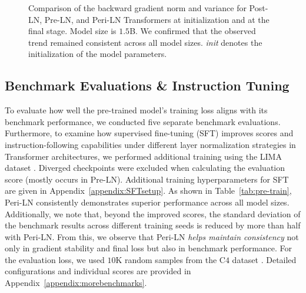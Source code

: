 \begin{figure*}[t]
    \centering
    \caption{Comparison of the backward gradient norm and variance for Post-LN, Pre-LN, and Peri-LN Transformers at initialization and at the final stage. Model size is $1.5$B. We confirmed that the observed trend remained consistent across all model sizes. \textit{init} denotes the initialization of the model parameters.}
    \label{fig:layerwise_gradient}
\vskip -0.1in
\end{figure*}

\subsection{Benchmark Evaluations \& Instruction Tuning} \label{subsec:sft}
To evaluate how well the pre-trained model’s training loss aligns with its benchmark performance, we conducted five separate benchmark evaluations. Furthermore, to examine how supervised fine-tuning (SFT) improves scores and instruction-following capabilities under different layer normalization strategies in Transformer architectures, we performed additional training using the LIMA dataset \citep{instructgpt, lima}. Diverged checkpoints were excluded when calculating the evaluation score (mostly occurs in Pre-LN). Additional training hyperparameters for SFT are given in Appendix~\ref{appendix:SFTsetup}. As shown in Table~\ref{tab:pre-train}, Peri-LN consistently demonstrates superior performance across all model sizes. Additionally, we note that, beyond the improved scores, the standard deviation of the benchmark results across different training seeds is reduced by more than half with Peri-LN. From this, we observe that Peri-LN \emph{helps maintain consistency} not only in gradient stability and final loss but also in benchmark performance. For the evaluation loss, we used $10$K random samples from the C$4$ dataset \citep{raffel2020c4}. Detailed configurations and individual scores are provided in Appendix~\ref{appendix:morebenchmarks}. 

